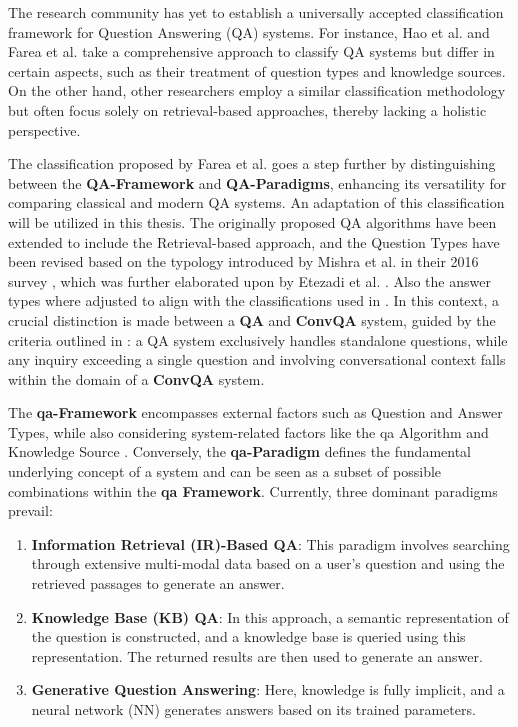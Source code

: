 The research community has yet to establish a universally accepted classification framework for Question Answering (QA) systems. For instance, Hao et al. and Farea et al. \cite{hao_recent_2022, farea_evaluation_2022} take a comprehensive approach to classify QA systems but differ in certain aspects, such as their treatment of question types and knowledge sources. On the other hand, other researchers \cite{zhu_retrieving_2021, jurafsky_speech_2023, etezadi_state_2023, zhang_survey_2023} employ a similar classification methodology but often focus solely on retrieval-based approaches, thereby lacking a holistic perspective.

The classification proposed by Farea et al. \cite{farea_evaluation_2022} goes a step further by distinguishing between the \textbf{QA-Framework} and \textbf{QA-Paradigms}, enhancing its versatility for comparing classical and modern QA systems. An adaptation of this classification will be utilized in this thesis. The originally proposed QA algorithms have been extended to include the Retrieval-based approach, and the Question Types have been revised based on the typology introduced by Mishra et al. in their 2016 survey \cite{mishra_survey_2016}, which was further elaborated upon by Etezadi et al. \cite{etezadi_state_2023}. Also the answer types where adjusted to align with the classifications used in \cite{mcdonald_detect_2022,dasigi_dataset_2021}. In this context, a crucial distinction is made between a \textbf{QA} and \textbf{ConvQA} system, guided by the criteria outlined in \cite{zamani_conversational_2023}: a QA system exclusively handles standalone questions, while any inquiry exceeding a single question and involving conversational context falls within the domain of a \textbf{ConvQA} system.

The \textbf{\gls{qa}-Framework} encompasses external factors such as Question and Answer Types, while also considering system-related factors like the \gls{qa} Algorithm and Knowledge Source \cite{farea_evaluation_2022, hao_recent_2022}. Conversely, the \textbf{\gls{qa}-Paradigm} defines the fundamental underlying concept of a system and can be seen as a subset of possible combinations within the \textbf{\gls{qa} Framework}. Currently, three dominant paradigms prevail:

\begin{enumerate}
    \item \textbf{Information Retrieval (IR)-Based QA}: This paradigm involves searching through extensive multi-modal data based on a user's question and using the retrieved passages to generate an answer.
    
    \item \textbf{Knowledge Base (KB) QA}: In this approach, a semantic representation of the question is constructed, and a knowledge base is queried using this representation. The returned results are then used to generate an answer.
    
    \item \textbf{Generative Question Answering}: Here, knowledge is fully implicit, and a neural network (NN) generates answers based on its trained parameters.

\end{enumerate}

